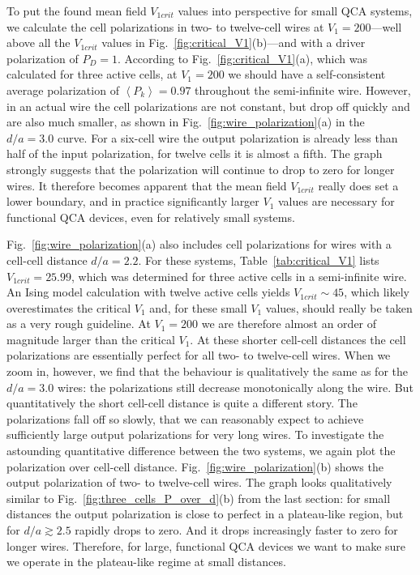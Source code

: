 To put the found mean field $V_{1crit}$ values into perspective for small QCA
systems, we calculate the cell polarizations in two- to twelve-cell wires at
$V_1 = 200$---well above all the $V_{1crit}$ values in
Fig.~\ref{fig:critical_V1}(b)---and with a driver polarization of $P_D = 1$.
According to Fig.~\ref{fig:critical_V1}(a), which was calculated for three
active cells, at $V_1 = 200$ we should have a self-consistent average
polarization of $\left< P_k \right> = 0.97$ throughout the semi-infinite wire.
However, in an actual wire the cell polarizations are not constant, but drop off
quickly and are also much smaller, as shown in
Fig.~\ref{fig:wire_polarization}(a) in the $d/a = 3.0$ curve. For a six-cell
wire the output polarization is already less than half of the input
polarization, for twelve cells it is almost a fifth. The graph strongly suggests
that the polarization will continue to drop to zero for longer wires.  It
therefore becomes apparent that the mean field $V_{1crit}$ really does set a
lower boundary, and in practice significantly larger $V_1$ values are necessary
for functional QCA devices, even for relatively small systems.

Fig.~\ref{fig:wire_polarization}(a) also includes cell polarizations for wires
with a cell-cell distance $d/a = 2.2$. For these systems,
Table~\ref{tab:critical_V1} lists $V_{1crit} = 25.99$, which was determined for
three active cells in a semi-infinite wire. An Ising model calculation with
twelve active cells yields $V_{1crit} \sim 45$, which likely overestimates the
critical $V_1$ and, for these small $V_1$ values, should really be taken as a
very rough guideline. At $V_1 = 200$ we are therefore almost an order of
magnitude larger than the critical $V_1$. At these shorter cell-cell distances
the cell polarizations are essentially perfect for all two- to twelve-cell
wires. When we zoom in, however, we find that the behaviour is qualitatively the
same as for the $d/a = 3.0$ wires: the polarizations still decrease
monotonically along the wire. But quantitatively the short cell-cell distance is
quite a different story. The polarizations fall off so slowly, that we can
reasonably expect to achieve sufficiently large output polarizations for very
long wires. To investigate the astounding quantitative difference between the
two systems, we again plot the polarization over cell-cell distance.
Fig.~\ref{fig:wire_polarization}(b) shows the output polarization of two- to
twelve-cell wires. The graph looks qualitatively similar to
Fig.~\ref{fig:three_cells_P_over_d}(b) from the last section: for small
distances the output polarization is close to perfect in a plateau-like region,
but for $d/a \gtrsim 2.5$ rapidly drops to zero. And it drops increasingly
faster to zero for longer wires. Therefore, for large, functional QCA devices we
want to make sure we operate in the plateau-like regime at small distances.


